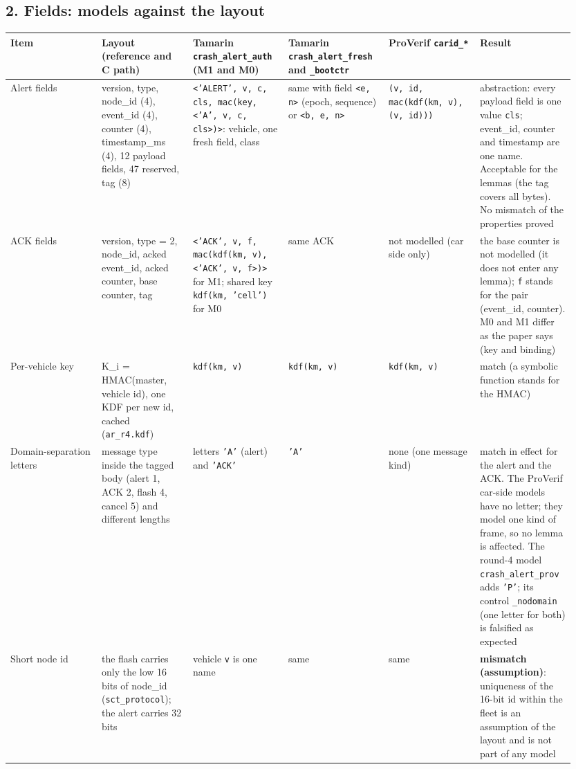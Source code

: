 \subsection*{2. Fields: models against the layout}

{\scriptsize\raggedright
\begin{longtable}{p{0.158\linewidth}p{0.158\linewidth}p{0.158\linewidth}p{0.158\linewidth}p{0.158\linewidth}p{0.158\linewidth}}
\toprule
Item & Layout (reference and C path) & Tamarin \texttt{crash\_alert\_auth} (M1 and M0) & Tamarin \texttt{crash\_alert\_fresh} and \texttt{\_bootctr} & ProVerif \texttt{carid\_*} & Result \\
\midrule
\endhead
Alert fields & version, type, node\_id (4), event\_id (4), counter (4), timestamp\_ms (4), 12 payload fields, 47 reserved, tag (8) & \texttt{<'ALERT', v, c, cls, mac(key, <'A', v, c, cls>)>}: vehicle, one fresh field, class & same with field \texttt{<e, n>} (epoch, sequence) or \texttt{<b, e, n>} & \texttt{(v, id, mac(kdf(km, v), (v, id)))} & abstraction: every payload field is one value \texttt{cls}; event\_id, counter and timestamp are one name. Acceptable for the lemmas (the tag covers all bytes). No mismatch of the properties proved \\
ACK fields & version, type = 2, node\_id, acked event\_id, acked counter, base counter, tag & \texttt{<'ACK', v, f, mac(kdf(km, v), <'ACK', v, f>)>} for M1; shared key \texttt{kdf(km, 'cell')} for M0 & same ACK & not modelled (car side only) & the base counter is not modelled (it does not enter any lemma); \texttt{f} stands for the pair (event\_id, counter). M0 and M1 differ as the paper says (key and binding) \\
Per-vehicle key & K\_i = HMAC(master, vehicle id), one KDF per new id, cached (\texttt{ar\_r4.kdf}) & \texttt{kdf(km, v)} & \texttt{kdf(km, v)} & \texttt{kdf(km, v)} & match (a symbolic function stands for the HMAC) \\
Domain-separation letters & message type inside the tagged body (alert 1, ACK 2, flash 4, cancel 5) and different lengths & letters \texttt{'A'} (alert) and \texttt{'ACK'} & \texttt{'A'} & none (one message kind) & match in effect for the alert and the ACK. The ProVerif car-side models have no letter; they model one kind of frame, so no lemma is affected. The round-4 model \texttt{crash\_alert\_prov} adds \texttt{'P'}; its control \texttt{\_nodomain} (one letter for both) is falsified as expected \\
Short node id & the flash carries only the low 16 bits of node\_id (\texttt{sct\_protocol}); the alert carries 32 bits & vehicle \texttt{v} is one name & same & same & \textbf{mismatch (assumption)}: uniqueness of the 16-bit id within the fleet is an assumption of the layout and is not part of any model \\

\end{longtable}}
